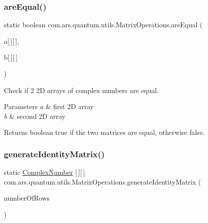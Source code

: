 \subsubsection{\texorpdfstring{are\+Equal()}{areEqual()}\hspace{0.1cm}{\footnotesize\ttfamily [2/2]}}
{\footnotesize\ttfamily static boolean com.\+ars.\+quantum.\+utils.\+Matrix\+Operations.\+are\+Equal (\begin{DoxyParamCaption}\item[{\hyperlink{classcom_1_1ars_1_1complexnumbers_1_1_complex_number}{Complex\+Number}}]{a\mbox{[}$\,$\mbox{]}\mbox{[}$\,$\mbox{]},  }\item[{\hyperlink{classcom_1_1ars_1_1complexnumbers_1_1_complex_number}{Complex\+Number}}]{b\mbox{[}$\,$\mbox{]}\mbox{[}$\,$\mbox{]} }\end{DoxyParamCaption})\hspace{0.3cm}{\ttfamily [static]}}

Check if 2 2D arrays of complex numbers are equal.


\begin{DoxyParams}{Parameters}
{\em a} & first 2D array \\
\hline
{\em b} & second 2D array \\
\hline
\end{DoxyParams}
\begin{DoxyReturn}{Returns}
boolean true if the two matrices are equal, otherwise false. 
\end{DoxyReturn}
\hypertarget{classcom_1_1ars_1_1quantum_1_1utils_1_1_matrix_operations_a0f677528a5f918884277771667bf2133}{}\label{classcom_1_1ars_1_1quantum_1_1utils_1_1_matrix_operations_a0f677528a5f918884277771667bf2133} 
\subsubsection{\texorpdfstring{generate\+Identity\+Matrix()}{generateIdentityMatrix()}}
{\footnotesize\ttfamily static \hyperlink{classcom_1_1ars_1_1complexnumbers_1_1_complex_number}{Complex\+Number} \mbox{[}$\,$\mbox{]}\mbox{[}$\,$\mbox{]} com.\+ars.\+quantum.\+utils.\+Matrix\+Operations.\+generate\+Identity\+Matrix (\begin{DoxyParamCaption}\item[{int}]{number\+Of\+Rows }\end{DoxyParamCaption})\hspace{0.3cm}{\ttfamily [static]}}

